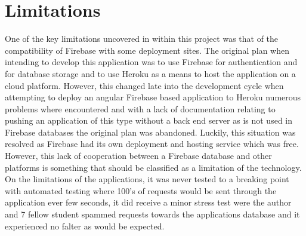 \section{Limitations}
One of the key limitations uncovered in within this project was that of the compatibility of Firebase with some deployment sites. The original plan when intending to develop this application was to use Firebase for authentication and for database storage and to use Heroku as a means to host the application on a cloud platform. However, this changed late into the development cycle when attempting to deploy an angular Firebase based application to Heroku numerous problems where encountered and with a lack of documentation relating to pushing an application of this type without a back end server as is not used in Firebase databases the original plan was abandoned. Luckily, this situation was resolved as Firebase had its own deployment and hosting service which was free. However, this lack of cooperation between a Firebase database and other platforms is something that should be classified as a limitation of the technology. On the limitations of the applications, it was never tested to a breaking point with automated testing where 100's of requests would be sent through the application ever few seconds, it did receive a minor stress test were the author and 7 fellow student spammed requests towards the applications database and it experienced no falter as would be expected.


















